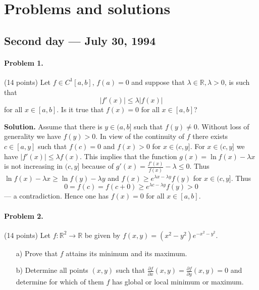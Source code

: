 \documentclass{article}
\begin{document}
\pagestyle{plain}

\section*{Problems and solutions}

\subsection*{Second day — July 30, 1994}


\paragraph{Problem 1.} (14 points)
Let $f \in C^1[a, b]$, $f(a) = 0$ and suppose that $\lambda \in \mathbb{R}, \lambda > 0$, is such that
\[
|f'(x)| \leq \lambda|f(x)|
\]
for all $x \in [a, b]$. Is it true that $f(x) = 0$ for all $x \in [a, b]$?

\textbf{Solution.}
Assume that there is $y \in (a, b]$ such that $f(y) \neq 0$. Without loss of generality we have $f(y) > 0$. In view of the continuity of $f$ there exists $c \in [a, y]$ such that $f(c) = 0$ and $f(x) > 0$ for $x \in (c, y]$. For $x \in (c, y]$ we have $|f'(x)| \leq \lambda f(x)$. This implies that the function $g(x) = \ln f(x) - \lambda x$ is not increasing in $(c, y]$ because of $g'(x) = \frac{f'(x)}{f(x)} - \lambda \leq 0$. Thus $\ln f(x) - \lambda x \geq \ln f(y) - \lambda y$ and $f(x) \geq e^{\lambda x - \lambda y}f(y)$ for $x \in (c, y]$. Thus
\[
0 = f(c) = f(c + 0) \geq e^{\lambda c - \lambda y}f(y) > 0
\]
--- a contradiction. Hence one has $f(x) = 0$ for all $x \in [a, b]$.

\paragraph{Problem 2.} (14 points)
Let $f : \mathbb{R}^2 \to \mathbb{R}$ be given by $f(x,y) = (x^2 - y^2)e^{-x^2-y^2}$.
\begin{itemize}
    \item[a)] Prove that $f$ attains its minimum and its maximum.
    \item[b)] Determine all points $(x, y)$ such that $\frac{\partial f}{\partial x}(x, y) = \frac{\partial f}{\partial y}(x, y) = 0$ and determine for which of them $f$ has global or local minimum or maximum.
\end{itemize}
\end{document}
